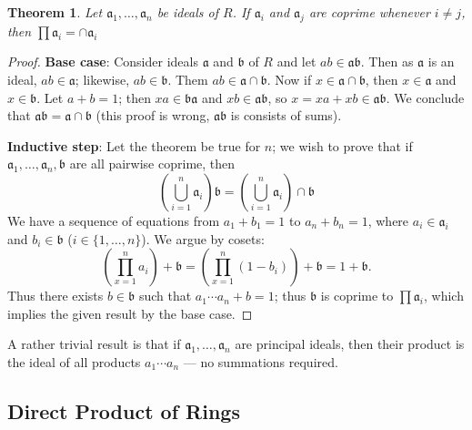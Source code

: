 \documentclass[11pt]{article}
\newtheorem{theorem}{Theorem}
\begin{document}
\begin{adjustwidth}{0.5cm}{}
	\begin{theorem}
		Let $\mathfrak{a}_{1}, \ldots, \mathfrak{a}_{n}$ be ideals of $R$. If $\mathfrak{a}_{i}$ and $\mathfrak{a}_{j}$ are coprime whenever $i \ne j$, then $\prod \mathfrak{a}_{i} = \cap \mathfrak{a}_{i}$
	\end{theorem}
	\begin{proof}
		\textbf{Base case}: Consider ideals $\mathfrak{a}$ and $\mathfrak{b}$ of $R$ and let $ab \in \mathfrak{a}\mathfrak{b}$. Then as $\mathfrak{a}$ is an ideal, $ab \in \mathfrak{a}$; likewise, $ab \in \mathfrak{b}$. Them $ab \in \mathfrak{a} \cap \mathfrak{b}$. Now if $x \in \mathfrak{a} \cap \mathfrak{b}$, then $x \in \mathfrak{a}$ and $x \in \mathfrak{b}$. Let $a + b = 1$; then $xa \in \mathfrak{b}\mathfrak{a}$ and $xb \in \mathfrak{a}\mathfrak{b}$, so $x = xa + xb \in \mathfrak{a}\mathfrak{b}$. We conclude that $\mathfrak{a}\mathfrak{b} = \mathfrak{a} \cap \mathfrak{b}$ (this proof is wrong, $\mathfrak{ab}$ is consists of sums).

		\textbf{Inductive step}: Let the theorem be true for $n$; we wish to prove that if $\mathfrak{a}_{1}, \ldots, \mathfrak{a}_{n}, \mathfrak{b}$ are all pairwise coprime, then
		\[
			\left( \bigcup\limits_{i = 1}^{n} \mathfrak{a}_{i} \right) \mathfrak{b} = \left( \bigcup\limits_{i = 1}^{n} \mathfrak{a}_{i} \right) \cap \mathfrak{b}
		\]
		We have a sequence of equations from $a_{1} + b_{1} = 1$ to $a_{n} + b_{n} = 1$, where $a_{i} \in \mathfrak{a}_{i}$ and $b_{i} \in \mathfrak{b}$ ($i \in \{ 1, \ldots, n \}$). We argue by cosets:
		\[
			\left( \prod\limits_{x = 1}^{n} a_{i} \right) + \mathfrak{b} = \left( \prod\limits_{x = 1}^{n} (1 - b_{i}) \right) + \mathfrak{b} = 1 +  \mathfrak{b}.
		\]
		Thus there exists $b \in \mathfrak{b}$ such that $a_{1} \cdots a_{n} + b = 1$; thus $\mathfrak{b}$ is coprime to $\prod \mathfrak{a}_{i}$, which implies the given result by the base case.
	\end{proof}
\end{adjustwidth}

A rather trivial result is that if $\mathfrak{a}_{1}, \ldots, \mathfrak{a}_{n}$ are principal ideals, then their product is the ideal of all products $a_{1} \cdots a_{n}$ --- no summations required.


\subsection{Direct Product of Rings}
\end{document}
